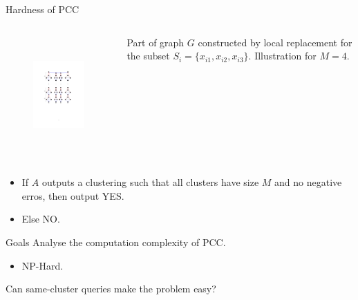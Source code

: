 \documentclass{beamer}
\begin{document}
\begin{frame}{Hardness of PCC}
	\begin{columns}
		\begin{column}{0.48\textwidth}
			\vspace{-40pt}\begin{figure}
				\centering
				\includegraphics[trim = 100 290 100 100, clip, width=6cm, height=4.5cm]{figures/deDuplication/pccHard.pdf}
			\end{figure}
		\end{column}

		\begin{column}{0.48\textwidth}
		    Part of graph $G$ constructed by local replacement for the subset $S_i =  \{x_{i1}, x_{i2}, x_{i3}\}$. Illustration for $M = 4$.
		\end{column}
	\end{columns}

	
	\vspace{20pt}\begin{itemize}
		\item If $A$ outputs a clustering such that all clusters have size $M$ and no negative erros, then output YES.
		\vspace{10pt}\item Else NO.
	\end{itemize}
\end{frame}

\begin{frame}{Goals}
	Analyse the computation complexity of PCC.
	\begin{itemize}
		\vspace{10pt}\item NP-Hard.
	\end{itemize}	 
	\vspace{30pt}\alert{Can same-cluster queries make the problem easy}?	
\end{frame}
\end{document}
